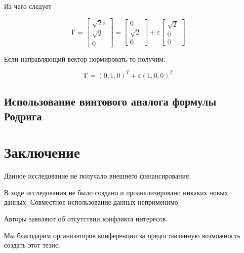 \documentclass[%
]{ittmm}
\begin{document}
Из чего следует

\begin{equation*}
  \mathbf{l}'=
  \begin{bmatrix}
    \sqrt{2} \varepsilon \\
    \sqrt{2} \\
    0
  \end{bmatrix}
  =
  \begin{bmatrix}
    0 \\
    \sqrt{2} \\
    0
  \end{bmatrix}
  + \varepsilon
  \begin{bmatrix}
    \sqrt{2} \\
    0 \\
    0
  \end{bmatrix}
\end{equation*}

Если направляющий вектор нормировать то получим:

\begin{equation*}
  \mathbf{l}' = (0,1,0)^T + \varepsilon (1,0,0)^T
\end{equation*}

\subsection{Использование винтового аналога формулы Родрига}


\section{Заключение}



\vspace{\baselineskip}


\begin{funding}
  Данное исследование не получало внешнего финансирования.
\end{funding}

\begin{dataavailability}
  В ходе исследования не было создано и проанализировано никаких новых данных. Совместное использование данных неприменимо.
\end{dataavailability}

\begin{conflictsofinterest}
  Авторы заявляют об отсутствии конфликта интересов.
\end{conflictsofinterest}

\begin{acknowledgments}
  Мы благодарим организаторов конференции за предоставленную возможность создать этот тезис.
\end{acknowledgments}

\printbibliography
\end{document}
